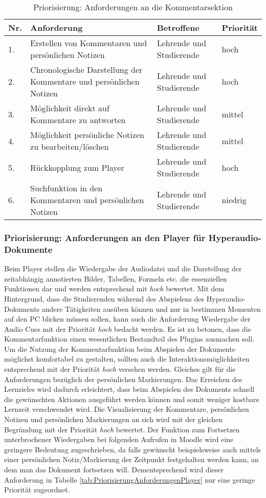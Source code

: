 \begin{table}[!ht]
\def\arraystretch{1.4}
\caption{Priorisierung: Anforderungen an die Kommentarsektion}
\label{tab:PriorisierungAnforderungenKommentarsektion}
 \begin{tabularx}{\textwidth}{lXll}      
    \hline
    Nr. & Anforderung & Betroffene & Priorität
    \\\hline
    1. & Erstellen von Kommentaren und persönlichen Notizen & Lehrende und Studierende & hoch\\
    2. & Chronologische Darstellung der Kommentare und persönlichen Notizen & Lehrende und Studierende & hoch\\
    3. & Möglichkeit direkt auf Kommentare zu antworten & Lehrende und Studierende & mittel\\
    4. & Möglichkeit persönliche Notizen zu bearbeiten/löschen & Lehrende und Studierende & mittel\\
    5. & Rückkopplung zum Player & Lehrende und Studierende & hoch\\
    6. & Suchfunktion in den Kommentaren und persönlichen Notizen & Lehrende und Studierende & niedrig\\
    \end{tabularx}
\end{table}

\subsubsection{Priorisierung: Anforderungen an den Player für Hyperaudio-Dokumente}
Beim Player stellen die Wiedergabe der Audiodatei und die Darstellung der zeitabhängig annotierten Bilder, Tabellen, Formeln etc. die essenziellen Funktionen dar und werden entsprechend mit \textit{hoch} bewertet. Mit dem Hintergrund, dass die Studierenden während des Abspielens des Hyperaudio-Dokuments andere Tätigkeiten ausüben können und nur in bestimmen Momenten auf den PC blicken müssen sollen, kann auch die Anforderung \glqq Wiedergabe der Audio Cues\grqq{} mit der Priorität \textit{hoch} bedacht werden. Es ist zu betonen, dass die Kommentarfunktion einen wesentlichen Bestandteil des Plugins ausmachen soll. Um die Nutzung der Kommentarfunktion beim Abspielen der Dokumente möglichst komfortabel zu gestalten, sollten auch die Interaktionsmöglichkeiten entsprechend mit der Priorität \textit{hoch} versehen werden. Gleiches gilt für die Anforderungen bezüglich der persönlichen Markierungen. Das Erreichen des Lernzieles wird dadurch erleichtert, dass beim Abspielen des Dokuments schnell die gewünschten Aktionen ausgeführt werden können und somit weniger kostbare Lernzeit verschwendet wird. Die Visualisierung der Kommentare, persönlichen Notizen und persönlichen Markierungen an sich wird mit der gleichen Begründung mit der Priorität \textit{hoch} bewertet. Der Funktion zum Fortsetzen unterbrochener Wiedergaben bei folgenden Aufrufen in Moodle wird eine geringere Bedeutung zugeschrieben, da falls gewünscht beispielsweise auch mittels einer persönlichen Notiz/Markierung der Zeitpunkt festgehalten werden kann, an dem man das Dokument fortsetzen will. Dementsprechend wird dieser Anforderung in Tabelle \ref{tab:PriorisierungAnforderungenPlayer} nur eine geringe Priorität zugeordnet.

